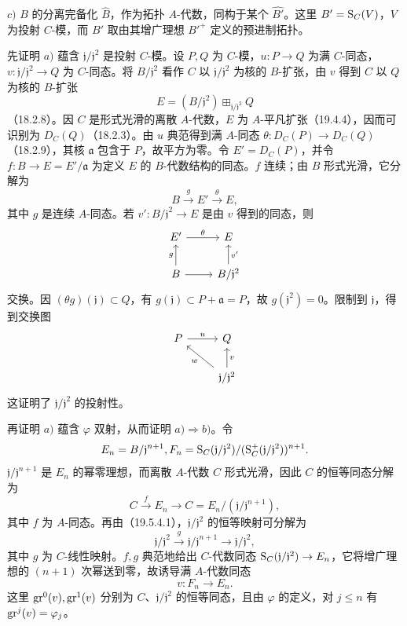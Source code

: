 $c)$ $B$ 的分离完备化 $\widehat B$，作为拓扑 $A$-代数，同构于某个 $\widehat{B'}$。这里 $B'=\mathrm S_C(V)$，$V$ 为投射 $C$-模，而 $B'$ 取由其增广理想 $B'^+$ 定义的预进制拓扑。

先证明 $a)$ 蕴含 $\mathfrak j/\mathfrak j^2$ 是投射 $C$-模。设 $P,Q$ 为 $C$-模，$u:P\to Q$ 为满 $C$-同态，$v:\mathfrak j/\mathfrak j^2\to Q$ 为 $C$-同态。将 $B/\mathfrak j^2$ 看作 $C$ 以 $\mathfrak j/\mathfrak j^2$ 为核的 $B$-扩张，由 $v$ 得到 $C$ 以 $Q$ 为核的 $B$-扩张
\[
 E=(B/\mathfrak j^2)\boxplus_{\mathfrak j/\mathfrak j^2}Q
\]
（18.2.8）。因 $C$ 是形式光滑的离散 $A$-代数，$E$ 为 $A$-平凡扩张（19.4.4），因而可识别为 $D_C(Q)$（18.2.3）。由 $u$ 典范得到满 $A$-同态
$\theta:D_C(P)\to D_C(Q)$（18.2.9），其核 $\mathfrak a$ 包含于 $P$，故平方为零。令 $E'=D_C(P)$，并令 $f:B\to E=E'/\mathfrak a$ 为定义 $E$ 的 $B$-代数结构的同态。$f$ 连续；由 $B$ 形式光滑，它分解为
\[
 B\xrightarrow{g}E'\xrightarrow{\theta}E,
\]
其中 $g$ 是连续 $A$-同态。若 $v':B/\mathfrak j^2\to E$ 是由 $v$ 得到的同态，则
\[
\begin{tikzcd}
 E'\arrow[r,"\theta"]&E\\
 B\arrow[u,"g"]\arrow[r]&B/\mathfrak j^2\arrow[u,"v'"']
\end{tikzcd}
\]
交换。因 $(\theta g)(\mathfrak j)\subset Q$，有 $g(\mathfrak j)\subset P+\mathfrak a=P$，故 $g(\mathfrak j^2)=0$。限制到 $\mathfrak j$，得到交换图
\[
\begin{tikzcd}
 P\arrow[r,"u"]&Q\\
 &\mathfrak j/\mathfrak j^2\arrow[ul,"w"]\arrow[u,"v"']
\end{tikzcd}
\]
这证明了 $\mathfrak j/\mathfrak j^2$ 的投射性。

再证明 $a)$ 蕴含 $\varphi$ 双射，从而证明 $a)\Rightarrow b)$。令
\[
 E_n=B/\mathfrak j^{n+1},
 F_n=\mathrm S_C(\mathfrak j/\mathfrak j^2)/(\mathrm S_C^+(\mathfrak j/\mathfrak j^2))^{n+1}.
\]
$\mathfrak j/\mathfrak j^{n+1}$ 是 $E_n$ 的幂零理想，而离散 $A$-代数 $C$ 形式光滑，因此 $C$ 的恒等同态分解为
\[
 C\xrightarrow{f}E_n\longrightarrow C=E_n/(\mathfrak j/\mathfrak j^{n+1}),
\]
其中 $f$ 为 $A$-同态。再由（19.5.4.1），$\mathfrak j/\mathfrak j^2$ 的恒等映射可分解为
\[
 \mathfrak j/\mathfrak j^2\xrightarrow{g}\mathfrak j/\mathfrak j^{n+1}
          \longrightarrow\mathfrak j/\mathfrak j^2,
\]
其中 $g$ 为 $C$-线性映射。$f,g$ 典范地给出 $C$-代数同态
$\mathrm S_C(\mathfrak j/\mathfrak j^2)\to E_n$，它将增广理想的 $(n+1)$ 次幂送到零，故诱导满 $A$-代数同态
\[
 v:F_n\longrightarrow E_n.
\]
这里 $\operatorname{gr}^0(v),\operatorname{gr}^1(v)$ 分别为 $C$、$\mathfrak j/\mathfrak j^2$ 的恒等同态，且由 $\varphi$ 的定义，对 $j\leq n$ 有 $\operatorname{gr}^j(v)=\varphi_j$。

